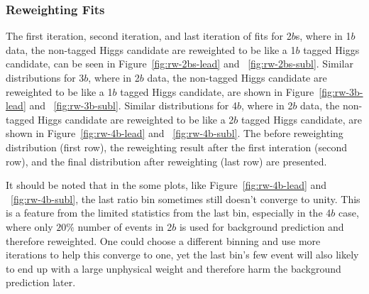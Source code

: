 \subsubsection{Reweighting Fits}
\label{sec:boosted-Reweight-Fit}
The first iteration, second iteration, and last iteration of fits for 2$b$s, where in 1$b$ data, the non-tagged Higgs candidate are reweighted to be like a 1$b$ tagged Higgs candidate, can be seen in Figure~\ref{fig:rw-2bs-lead} and ~\ref{fig:rw-2bs-subl}. Similar distributions for 3$b$, where in 2$b$ data, the non-tagged Higgs candidate are reweighted to be like a 1$b$ tagged Higgs candidate, are shown in Figure~\ref{fig:rw-3b-lead} and ~\ref{fig:rw-3b-subl}. Similar distributions for 4$b$, where in 2$b$ data, the non-tagged Higgs candidate are reweighted to be like a 2$b$ tagged Higgs candidate, are shown in Figure~\ref{fig:rw-4b-lead} and ~\ref{fig:rw-4b-subl}. The before reweighting distribution (first row), the reweighting result after the first interation (second row), and the final distribution after reweighting (last row) are presented.

It should be noted that in the some plots, like Figure~\ref{fig:rw-4b-lead} and ~\ref{fig:rw-4b-subl}, the last ratio bin sometimes still doesn't converge to unity. This is a feature from the limited statistics from the last bin, especially in the 4$b$ case, where only $20\%$ number of events in 2$b$ is used for background prediction and therefore reweighted. One could choose a different binning and use more iterations to help this converge to one, yet the last bin's few event will also likely to end up with a large unphysical weight and therefore harm the background prediction later.

